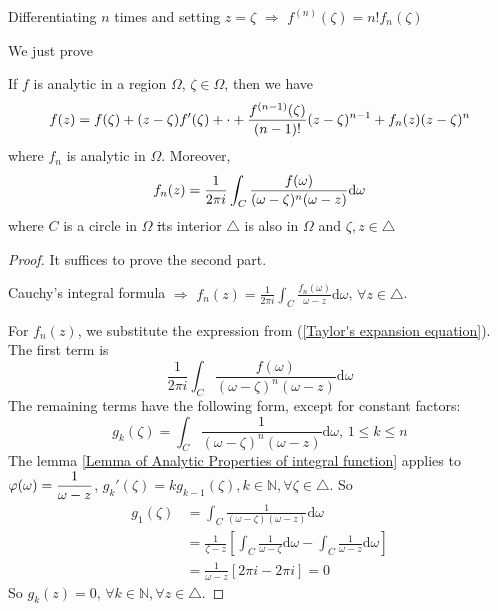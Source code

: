 Differentiating  $ n $ times and setting  $ z=\zeta $ $ \Rightarrow $ $ f^{(n)}(\zeta) =n!f_n(\zeta)$    

We just prove 
\begin{theorem}\label{Taylor's Theorem}
    If  $ f $ is analytic in a region  $ \Omega $,  $ \zeta\in\Omega $, then we have 
    \begin{equation}
        f(z)=f(\zeta)+(z-\zeta)f'(\zeta)+\cdot+\displaystyle\frac{f^{(n-1)}(\zeta)}{(n-1)!}(z-\zeta)^{n-1}+f_n(z)(z-\zeta)^n\label{Taylor's expansion equation}
    \end{equation}   
    where  $ f_n $ is analytic in  $ \Omega $. Moreover,
    \begin{equation}
        f_n(z)=\displaystyle\frac{1}{2\pi i}\int_C\frac{f(\omega)}{(\omega-\zeta)^n(\omega-z)}\mathrm{d}\omega
    \end{equation}  
    where  $ C $ is a circle in  $ \Omega $ \st  its interior  $ \triangle $ is also in  $ \Omega $ and  $ \zeta,z\in \triangle $     
\end{theorem}
\begin{proof}
    It suffices to prove the second part.
    
    Cauchy's integral formula $ \Rightarrow  $ $ f_n(z)=\frac{1}{2\pi i}\int_C\frac{f_n(\omega)}{\omega-z}\mathrm{d}\omega $, $ \forall z\in\triangle $.
    
    For  $ f_n(z) $, we substitute the expression from  (\ref{Taylor's expansion equation}). The first term is 
    \begin{equation}
        \frac{1}{2\pi i}\int_C\frac{f(\omega)}{(\omega-\zeta)^n(\omega-z)}\mathrm{d}\omega
    \end{equation}
    The remaining terms have the following form, except for constant factors:
    \begin{equation}
        g_k(\zeta)=\int_C\frac{1}{(\omega-\zeta)^n(\omega-z)}\mathrm{d}\omega,\,1 \leq k \leq n
    \end{equation}
    The lemma \ref{Lemma of Analytic Properties of integral function} applies to  $ \varphi(\omega)=\displaystyle\frac{1}{\omega-z} $,  $ g_k'(\zeta)=kg_{k-1}(\zeta),k\in\mathbb{N},\forall \zeta\in\triangle $. So 
    \begin{equation}
        \begin{aligned}
            g_1(\zeta)&=\int_C\frac{1}{(\omega-\zeta)(\omega-z)}\mathrm{d}\omega\\
            &=\frac{1}{\zeta-z}\left[\int_C\frac{1}{\omega-\zeta}\mathrm{d}\omega-\int_C\frac{1}{\omega-z}\mathrm{d}\omega\right]\\
            &=\frac{1}{\omega-z}[2\pi i-2\pi i]=0
        \end{aligned}
    \end{equation}  
    So  $ g_k(z)=0,\,\forall k\in\mathbb{N},\forall z\in\triangle $. 
\end{proof}
